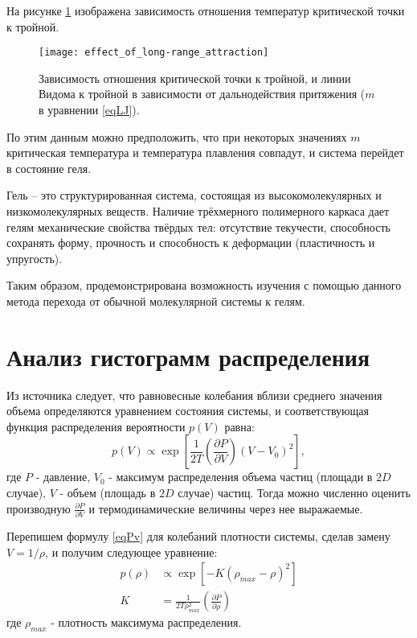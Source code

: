 На рисунке \ref{risTcpTtp} изображена зависимость отношения температур критической точки к тройной.

\begin{figure}[h]
\begin{center}
\texttt{[image: effect\_of\_long-range\_attraction]}
\caption{Зависимость отношения критической точки к тройной, и линии Видома к тройной в зависимости от дальнодействия притяжения ($m$ в уравнении \ref{eqLJ}).}
\label{risTcpTtp}
\end{center}
\end{figure}

По этим данным можно предположить, что при некоторых значениях $m$ критическая температура и температура плавления совпадут, и система перейдет в состояние геля. 

Гель -- это структурированная система, состоящая из высокомолекулярных и низкомолекулярных веществ. Наличие трёхмерного полимерного каркаса дает гелям механические свойства твёрдых тел: отсутствие текучести, способность сохранять форму, прочность и способность к деформации (пластичность и упругость).

Таким образом, продемонстрирована возможность изучения с помощью данного метода перехода от обычной молекулярной системы к гелям. 


\section{Анализ гистограмм распределения}\label{C2_3}

Из источника \cite{Yur54} следует, что равновесные колебания вблизи среднего значения объема определяются уравнением состояния системы, и соответствующая функция распределения вероятности $p(V)$ равна:
\begin{equation}
p(V) \varpropto \exp\left[ \frac{1}{2T} \left( \frac{\partial P}{\partial V} \right)  \left(V - V_0 \right)^2 \right],
\label{eqPv}
\end{equation}
где $P$ - давление, $V_0$ - максимум распределения объема частиц (площади в $2D$ случае), $V$ - объем (площадь в $2D$ случае) частиц.
Тогда можно численно оценить производную $\frac{\partial P}{\partial V}$ и термодинамические величины через нее выражаемые.

Перепишем формулу \ref{eqPv} для колебаний плотности системы, сделав замену $V = 1 / \rho$, и получим следующее уравнение:
\begin{equation}
\begin{aligned}
p(\rho) &\varpropto \exp \left[ - K \left(\rho_{max}- \rho \right)^2 \right] \\
K &= \frac{1}{2T\rho_{max}^2} \left( \frac{\partial P}{\partial \rho} \right)
\end{aligned}
\label{eqFitRho}
\end{equation}
где $\rho_{max}$ - плотность максимума распределения.

